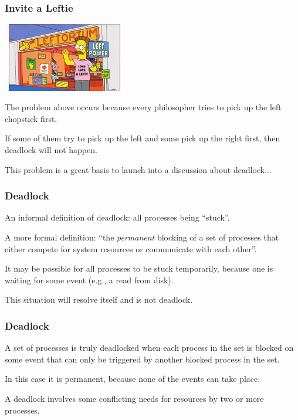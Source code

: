 \begin{frame}
	\frametitle{Invite a Leftie}

	\begin{center}
		\includegraphics[width=0.4\textwidth]{images/leftorium.jpg}
	\end{center}

	The problem above occurs because every philosopher tries to pick up the left chopstick first.

	If some of them try to pick up the left and some pick up the right first, then deadlock will not happen.

	This problem is a great basis to launch into a discussion about deadlock...

\end{frame}



\begin{frame}
	\frametitle{Deadlock}

	An informal definition of deadlock: all processes being ``stuck''.

	A more formal definition: ``the \textit{permanent} blocking of a set of processes that either compete for system resources or communicate with each other''.

	It may be possible for all processes to be stuck temporarily, because one is waiting for some event (e.g., a read from disk).

	This situation will resolve itself and is not deadlock.

\end{frame}


\begin{frame}
	\frametitle{Deadlock}
	A set of processes is truly deadlocked when each process in the set is blocked on some event that can only be triggered by another blocked process in the set.

	In this case it is permanent, because none of the events can take place.

	A deadlock involves some conflicting needs for resources by two or more processes.

\end{frame}


